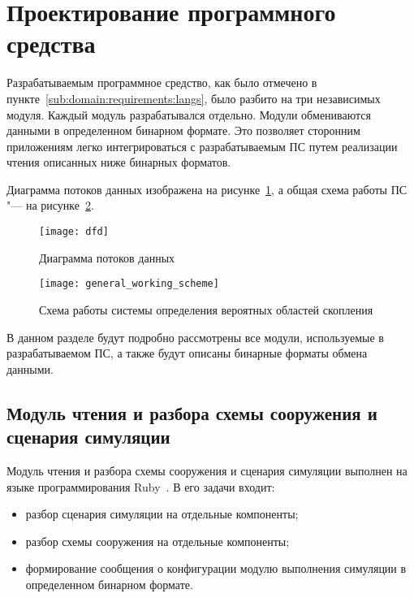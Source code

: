 \section{Проектирование программного средства} %
\label{sec:development}

Разрабатываемым программное средство, как было отмечено в пункте~\ref{sub:domain:requirements:langs}, было разбито на три независимых модуля.
Каждый модуль разрабатывался отдельно. Модули обмениваются данными в определенном бинарном формате.
Это позволяет сторонним приложениям легко интегрироваться с разрабатываемым ПС путем реализации чтения описанных ниже бинарных форматов.

Диаграмма потоков данных изображена на рисунке~\ref{sec:development:data_flow_diagramm}, а общая схема работы ПС "--- на рисунке~\ref{sec:development:general_working_scheme}.

\begin{figure}[ht]
  \texttt{[image: dfd]}
  \caption{Диаграмма потоков данных}
  \label{sec:development:data_flow_diagramm}
\end{figure}

\begin{figure}[!ht]
  \centering
  \texttt{[image: general\_working\_scheme]}
  \caption{Схема работы системы определения вероятных областей скопления}
  \label{sec:development:general_working_scheme}
\end{figure}

В данном разделе будут подробно рассмотрены все модули, используемые в разрабатываемом ПС, а также будут описаны бинарные форматы обмена данными.

\subsection{Модуль чтения и разбора схемы сооружения и сценария симуляции}
\label{sec:development:preprocessor}

Модуль чтения и разбора схемы сооружения и сценария симуляции выполнен на языке программирования Ruby~\cite{ruby_doc}.
В его задачи входит:
\begin{itemize}
  \item разбор сценария симуляции на отдельные компоненты;
  \item разбор схемы сооружения на отдельные компоненты;
  \item формирование сообщения о конфигурации модулю выполнения симуляции в определенном бинарном формате.
\end{itemize}

